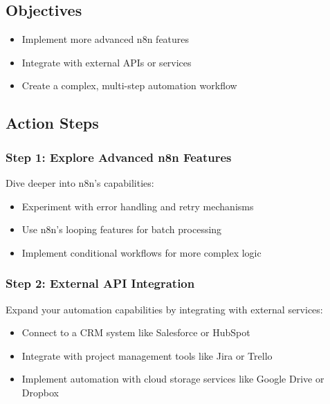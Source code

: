 \subsection{Objectives}
\begin{itemize}
    \item Implement more advanced n8n features
    \item Integrate with external APIs or services
    \item Create a complex, multi-step automation workflow
\end{itemize}

\subsection{Action Steps}

\subsubsection{Step 1: Explore Advanced n8n Features}
Dive deeper into n8n's capabilities:

\begin{itemize}
    \item Experiment with error handling and retry mechanisms
    \item Use n8n's looping features for batch processing
    \item Implement conditional workflows for more complex logic
\end{itemize}

\subsubsection{Step 2: External API Integration}
Expand your automation capabilities by integrating with external services:

\begin{itemize}
    \item Connect to a CRM system like Salesforce or HubSpot
    \item Integrate with project management tools like Jira or Trello
    \item Implement automation with cloud storage services like Google Drive or Dropbox
\end{itemize}

